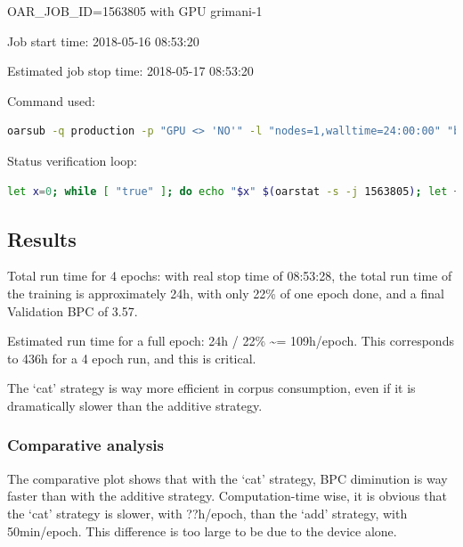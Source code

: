 OAR\_JOB\_ID=1563805 with GPU grimani-1

Job start time: 2018-05-16 08:53:20

Estimated job stop time: 2018-05-17 08:53:20

Command used:

\begin{lstlisting}[language=bash]
oarsub -q production -p "GPU <> 'NO'" -l "nodes=1,walltime=24:00:00" "bash runmsnn.sh"
\end{lstlisting}

Status verification loop:

\begin{lstlisting}[language=bash]
let x=0; while [ "true" ]; do echo "$x" $(oarstat -s -j 1563805); let ++x; sleep 120; done
\end{lstlisting}

\subsection{Results}

Total run time for 4 epochs: with real stop time of 08:53:28, the total
run time of the training is approximately 24h, with only 22\% of one
epoch done, and a final Validation BPC of 3.57.

Estimated run time for a full epoch: 24h / 22\% \textasciitilde{}=
109h/epoch. This corresponds to 436h for a 4 epoch run, and this is
critical.

The `cat' strategy is way more efficient in corpus consumption, even if
it is dramatically slower than the additive strategy.

\subsubsection{Comparative analysis}

The comparative plot shows that with the `cat' strategy, BPC diminution
is way faster than with the additive strategy. Computation-time wise, it
is obvious that the `cat' strategy is slower, with ??h/epoch, than the
`add' strategy, with 50min/epoch. This difference is too large to be due
to the device alone.

